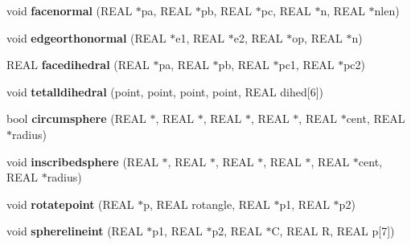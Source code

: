 \begin{DoxyCompactItemize}
\item 
\mbox{\label{classStemMesh3D_1_1tetgenmesh_a6f64c94f42c8b3d4b71e23b00b1a4c89}} 
void {\bfseries facenormal} (R\+E\+AL $\ast$pa, R\+E\+AL $\ast$pb, R\+E\+AL $\ast$pc, R\+E\+AL $\ast$n, R\+E\+AL $\ast$nlen)
\item 
\mbox{\label{classStemMesh3D_1_1tetgenmesh_af6ac55fd92bf9b11b90b8fbac48831b0}} 
void {\bfseries edgeorthonormal} (R\+E\+AL $\ast$e1, R\+E\+AL $\ast$e2, R\+E\+AL $\ast$op, R\+E\+AL $\ast$n)
\item 
\mbox{\label{classStemMesh3D_1_1tetgenmesh_a1e9d702984176d83701c4be09b19bd6c}} 
R\+E\+AL {\bfseries facedihedral} (R\+E\+AL $\ast$pa, R\+E\+AL $\ast$pb, R\+E\+AL $\ast$pc1, R\+E\+AL $\ast$pc2)
\item 
\mbox{\label{classStemMesh3D_1_1tetgenmesh_ade580edbddd2c4e8b325a472a3a3af0f}} 
void {\bfseries tetalldihedral} (point, point, point, point, R\+E\+AL dihed\mbox{[}6\mbox{]})
\item 
\mbox{\label{classStemMesh3D_1_1tetgenmesh_ac3b676b4515aa83901ae2b1519cffe42}} 
bool {\bfseries circumsphere} (R\+E\+AL $\ast$, R\+E\+AL $\ast$, R\+E\+AL $\ast$, R\+E\+AL $\ast$, R\+E\+AL $\ast$cent, R\+E\+AL $\ast$radius)
\item 
\mbox{\label{classStemMesh3D_1_1tetgenmesh_a5f859667e72f92f8b702959d67bc2981}} 
void {\bfseries inscribedsphere} (R\+E\+AL $\ast$, R\+E\+AL $\ast$, R\+E\+AL $\ast$, R\+E\+AL $\ast$, R\+E\+AL $\ast$cent, R\+E\+AL $\ast$radius)
\item 
\mbox{\label{classStemMesh3D_1_1tetgenmesh_aca662e04deded01ec0d6da18cc9dbac4}} 
void {\bfseries rotatepoint} (R\+E\+AL $\ast$p, R\+E\+AL rotangle, R\+E\+AL $\ast$p1, R\+E\+AL $\ast$p2)
\item 
\mbox{\label{classStemMesh3D_1_1tetgenmesh_a57503b11bd9e66e24884a867c23cb23c}} 
void {\bfseries spherelineint} (R\+E\+AL $\ast$p1, R\+E\+AL $\ast$p2, R\+E\+AL $\ast$C, R\+E\+AL R, R\+E\+AL p\mbox{[}7\mbox{]})
\item 

\end{DoxyCompactItemize}
